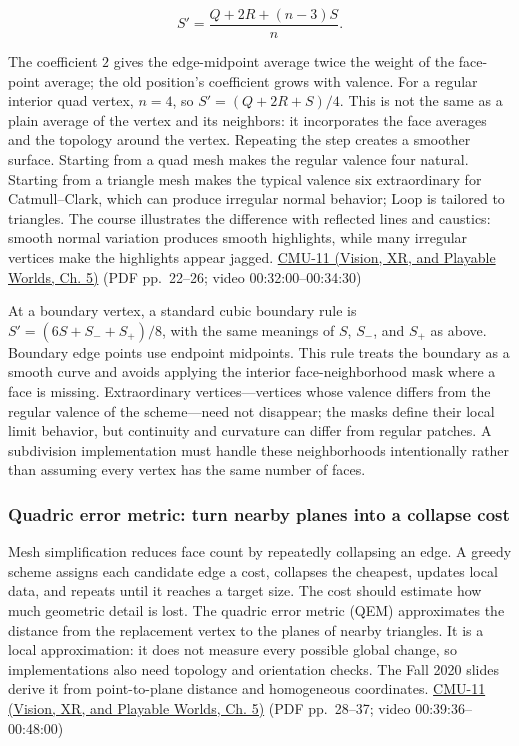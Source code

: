 \[
S'=\frac{Q+2R+(n-3)S}{n}.
\]

The coefficient \(2\) gives the edge-midpoint average twice the weight of the face-point average; the old position's coefficient grows with valence. For a regular interior quad vertex, \(n=4\), so \(S'=(Q+2R+S)/4\). This is not the same as a plain average of the vertex and its neighbors: it incorporates the face averages and the topology around the vertex. Repeating the step creates a smoother surface. Starting from a quad mesh makes the regular valence four natural. Starting from a triangle mesh makes the typical valence six extraordinary for Catmull--Clark, which can produce irregular normal behavior; Loop is tailored to triangles. The course illustrates the difference with reflected lines and caustics: smooth normal variation produces smooth highlights, while many irregular vertices make the highlights appear jagged. \href{../07-Vision-XR-and-Playable-Worlds/main.pdf\#nameddest=04-visual-computing-ii-ch036-cmu-11---digital-geometry-processing}{CMU-11 (Vision, XR, and Playable Worlds, Ch. 5)} (PDF pp.~22--26; video 00:32:00--00:34:30)

At a boundary vertex, a standard cubic boundary rule is \(S'=(6S+S_-+S_+)/8\), with the same meanings of \(S\), \(S_-\), and \(S_+\) as above. Boundary edge points use endpoint midpoints. This rule treats the boundary as a smooth curve and avoids applying the interior face-neighborhood mask where a face is missing. Extraordinary vertices---vertices whose valence differs from the regular valence of the scheme---need not disappear; the masks define their local limit behavior, but continuity and curvature can differ from regular patches. A subdivision implementation must handle these neighborhoods intentionally rather than assuming every vertex has the same number of faces.

\subsubsection{Quadric error metric: turn nearby planes into a collapse cost}\label{03-visual-computing-i-ch002-quadric-error-metric-turn-nearby-planes-into-a-collapse-cost}

Mesh simplification reduces face count by repeatedly collapsing an edge. A greedy scheme assigns each candidate edge a cost, collapses the cheapest, updates local data, and repeats until it reaches a target size. The cost should estimate how much geometric detail is lost. The quadric error metric (QEM) approximates the distance from the replacement vertex to the planes of nearby triangles. It is a local approximation: it does not measure every possible global change, so implementations also need topology and orientation checks. The Fall 2020 slides derive it from point-to-plane distance and homogeneous coordinates. \href{../07-Vision-XR-and-Playable-Worlds/main.pdf\#nameddest=04-visual-computing-ii-ch036-cmu-11---digital-geometry-processing}{CMU-11 (Vision, XR, and Playable Worlds, Ch. 5)} (PDF pp.~28--37; video 00:39:36--00:48:00)

